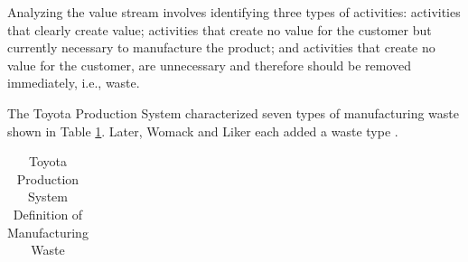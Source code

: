 Analyzing the value stream involves identifying three types of activities: activities that clearly create value; activities that create no value for the customer but currently necessary to manufacture the product; and activities that create no value for the customer, are unnecessary and therefore should be removed immediately, i.e., waste.

The Toyota Production System characterized seven types of manufacturing waste \cite{ShingoToyotaProductionSystem} shown in Table \ref{ManufacturingWaste}. Later, Womack and Liker each added a waste type \cite{WomackLeanThinking, LikerToyotaWay}.

\begin{table}[t]
\renewcommand{\arraystretch}{1.5}
\centering
\caption{Toyota Production System Definition of Manufacturing Waste}
\label{ManufacturingWaste}
\begin{tabular}{|p{2in}|p{4in}|}
\hline


\end{tabular}
\end{table}
